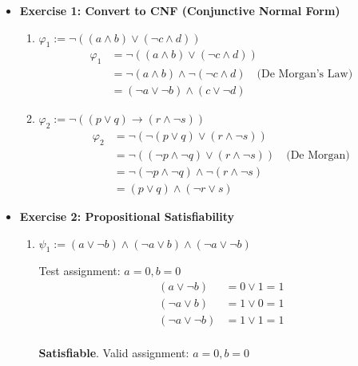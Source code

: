 \documentclass[11pt]{article}
\begin{document}
\begin{itemize}[leftmargin=*]

\item \textbf{Exercise 1: Convert to CNF (Conjunctive Normal Form)}

\begin{enumerate}
    \item \( \varphi_1 := \neg((a \land b) \lor (\neg c \land d)) \)
    \[
    \begin{aligned}
    \varphi_1 &= \neg((a \land b) \lor (\neg c \land d)) \\
              &= \neg(a \land b) \land \neg(\neg c \land d) \quad \text{(De Morgan's Law)} \\
              &= (\neg a \lor \neg b) \land (c \lor \neg d)
    \end{aligned}
    \]

    \item \( \varphi_2 := \neg((p \lor q) \rightarrow (r \land \neg s)) \)
    \[
    \begin{aligned}
    \varphi_2 &= \neg(\neg(p \lor q) \lor (r \land \neg s)) \\
              &= \neg((\neg p \land \neg q) \lor (r \land \neg s)) \quad \text{(De Morgan)} \\
              &= \neg(\neg p \land \neg q) \land \neg(r \land \neg s) \\
              &= (p \lor q) \land (\neg r \lor s)
    \end{aligned}
    \]
\end{enumerate}

\vspace{1em}

\item \textbf{Exercise 2: Propositional Satisfiability}

\begin{enumerate}
    \item \( \psi_1 := (a \lor \neg b) \land (\neg a \lor b) \land (\neg a \lor \neg b) \)

    Test assignment: \( a = 0, b = 0 \)
    \[
    \begin{aligned}
    (a \lor \neg b) &= 0 \lor 1 = 1 \\
    (\neg a \lor b) &= 1 \lor 0 = 1 \\
    (\neg a \lor \neg b) &= 1 \lor 1 = 1 \\
    \end{aligned}
    \]

    \textbf{Satisfiable}. Valid assignment: \( a = 0, b = 0 \)


\end{enumerate}
\end{itemize}
\end{document}
